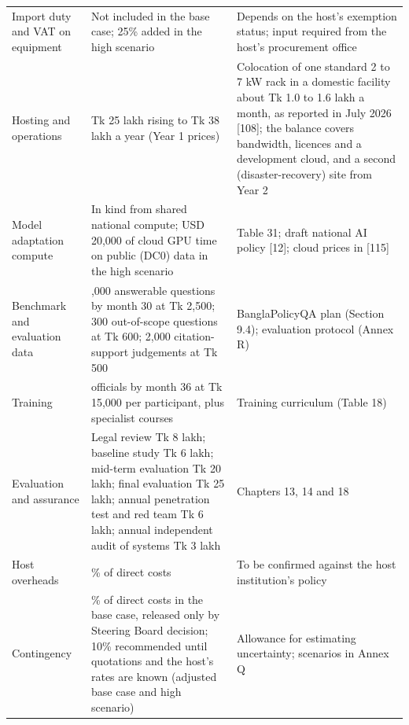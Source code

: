 \documentclass[border=10pt]{standalone}
\begin{document}
\begin{minipage}{17cm}
\begin{tabularx}{\linewidth}{@{}>{\hsize=0.679\hsize\raggedright\arraybackslash}X>{\hsize=1.286\hsize\raggedright\arraybackslash}X>{\hsize=1.036\hsize\raggedright\arraybackslash}X@{}}
Import duty and VAT on equipment & Not included in the base case; 25\% added in the high scenario & Depends on the host’s exemption status; input required from the host’s procurement office \\
Hosting and operations & Tk 25 lakh rising to Tk 38 lakh a year (Year 1 prices) & Colocation of one standard 2 to 7 kW rack in a domestic facility about Tk 1.0 to 1.6 lakh a month, as reported in July 2026 [108]; the balance covers bandwidth, licences and a development cloud, and a second (disaster-recovery) site from Year 2 \\
Model adaptation compute & In kind from shared national compute; USD 20,000 of cloud GPU time on public (DC0) data in the high scenario & Table 31; draft national AI policy [12]; cloud prices in [115] \\
Benchmark and evaluation data & 2,000 answerable questions by month 30 at Tk 2,500; 300 out-of-scope questions at Tk 600; 2,000 citation-support judgements at Tk 500 & BanglaPolicyQA plan (Section 9.4); evaluation protocol (Annex R) \\
Training & 500 officials by month 36 at Tk 15,000 per participant, plus specialist courses & Training curriculum (Table 18) \\
Evaluation and assurance & Legal review Tk 8 lakh; baseline study Tk 6 lakh; mid-term evaluation Tk 20 lakh; final evaluation Tk 25 lakh; annual penetration test and red team Tk 6 lakh; annual independent audit of systems Tk 3 lakh & Chapters 13, 14 and 18 \\
Host overheads & 10\% of direct costs & To be confirmed against the host institution’s policy \\
Contingency & 5\% of direct costs in the base case, released only by Steering Board decision; 10\% recommended until quotations and the host’s rates are known (adjusted base case and high scenario) & Allowance for estimating uncertainty; scenarios in Annex Q \\
\bottomrule
\end{tabularx}
\par{}
\par{}
\end{minipage}
\end{document}
